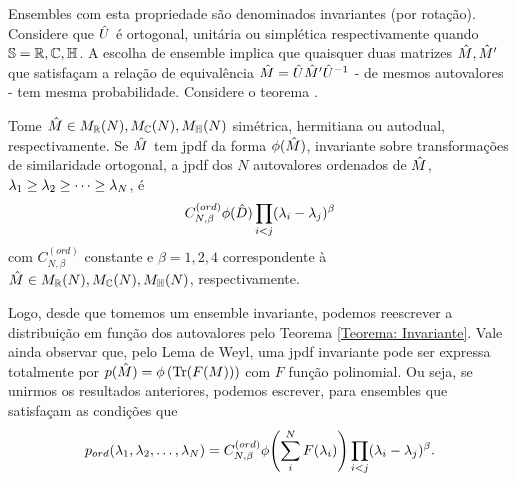 Ensembles com esta propriedade são denominados invariantes (por rotação). Considere que $\hat U$ é ortogonal, unitária ou simplética respectivamente quando $\mathbb{S} = \mathbb{R},\mathbb{C},\mathbb{H} $. A escolha de ensemble implica que quaisquer duas matrizes $\hat M, \hat M'$ que satisfaçam a relação de equivalência $\hat M = \hat U \hat M' \hat U^{-1}$ - de mesmos autovalores - tem mesma probabilidade. Considere o teorema \cite[Capítulo~3]{AlanThesis}.
\begin{thm}
	Tome $\hat M \in M_{\mathbb{R}}(N),  M_{\mathbb{C}}(N),  M_{\mathbb{H}}(N)$ simétrica, hermitiana ou autodual, respectivamente. Se  $\hat M$ tem jpdf da forma $\phi(\hat M)$, invariante sobre transformações de similaridade ortogonal, a jpdf dos $N$ autovalores ordenados de $\hat M$, $\lambda_1 \geq \lambda_2 \geq \dots \geq \lambda_N$, é $$ C_{N, \beta}^{(ord)} \phi(\hat D) \prod_{i < j} (\lambda_i - \lambda_j)^{\beta}$$ com $C_{N, \beta}^{(ord)}$ constante e $\beta = 1, 2, 4$ correspondente à $\hat M \in M_{\mathbb{R}}(N),  M_{\mathbb{C}}(N),  M_{\mathbb{H}}(N)$, respectivamente. 
	\label{Teorema: Invariante}
\end{thm}
Logo, desde que tomemos um ensemble invariante, podemos reescrever a distribuição em função dos autovalores pelo Teorema \ref{Teorema: Invariante}. Vale ainda observar que, pelo Lema de Weyl, uma jpdf invariante pode ser expressa totalmente por $p(\hat M)= \phi \left(\Tr(F(M)) \right)$ com $F$ função polinomial. Ou seja, se unirmos os resultados anteriores, podemos escrever, para ensembles que satisfaçam as condições que
\begin{equation}
	p_{ord}(\lambda_1, \lambda_2, \dots, \lambda_N) = C_{N, \beta}^{(ord)} \phi{\left( \sum_i^N F(\lambda_i) \right)} \prod_{i < j} (\lambda_i - \lambda_j)^{\beta}.
	\label{Equation: p-ord}
\end{equation}


